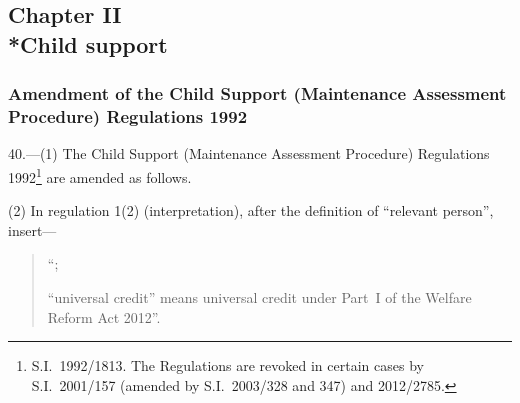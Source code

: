 \documentclass[12pt,a4paper]{article}
\begin{document}
\subsection[Chapter II --- Child support]{Chapter II\\*Child support}

\renewcommand\parthead{--- Part III Chapter II}

\subsubsection[40. Amendment of the Child Support (Maintenance Assessment Procedure) Regulations 1992]{Amendment of the Child Support (Maintenance Assessment Procedure) Regulations 1992}

40.—(1) The Child Support (Maintenance Assessment Procedure) Regulations 1992\footnote{S.I.~1992/1813. The Regulations are revoked in certain cases by S.I.~2001/157 (amended by S.I.~2003/328 and 347) and 2012/2785.} are amended as follows.

(2) In regulation 1(2) (interpretation), after the definition of “relevant person”, insert—
\begin{quotation}
“;

“universal credit” means universal credit under Part~I of the Welfare Reform Act 2012”.
\end{quotation}
\end{document}
